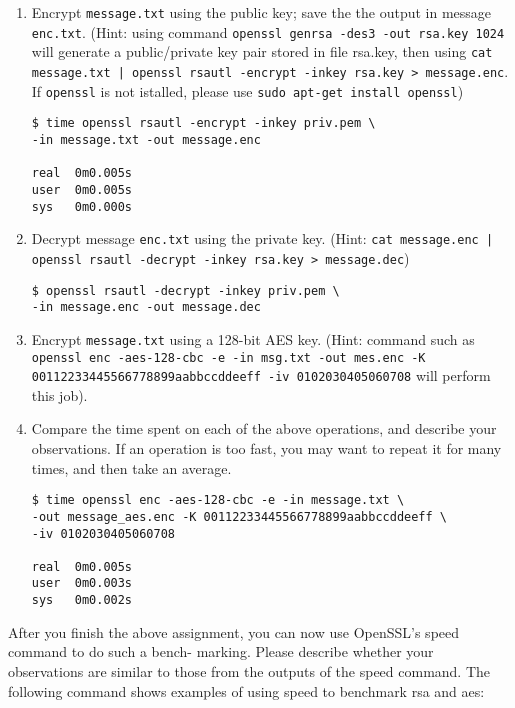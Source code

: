 \documentclass[11pt]{article}
\begin{document}
\begin{enumerate}
\item Encrypt \texttt{message.txt} using the public key; save the the output in message \texttt{enc.txt}.
(Hint: using command \texttt{openssl genrsa -des3 -out rsa.key 1024} will generate a public/private key pair stored in file rsa.key, then using \texttt{cat message.txt | openssl rsautl -encrypt -inkey rsa.key > message.enc}. If \texttt{openssl} is not istalled, please use \texttt{sudo apt-get install openssl})

\begin{verbatim}
$ time openssl rsautl -encrypt -inkey priv.pem \
-in message.txt -out message.enc

real  0m0.005s
user  0m0.005s
sys   0m0.000s
\end{verbatim}

\item Decrypt message \texttt{enc.txt} using the private key. (Hint: \texttt{cat message.enc | openssl rsautl -decrypt -inkey rsa.key > message.dec})

\begin{verbatim}
$ openssl rsautl -decrypt -inkey priv.pem \
-in message.enc -out message.dec
\end{verbatim}

\item Encrypt \texttt{message.txt} using a 128-bit AES key. (Hint: command such as \texttt{openssl enc -aes-128-cbc -e -in msg.txt -out mes.enc -K} \\ \texttt{00112233445566778899aabbccddeeff -iv 0102030405060708} will perform this job).
\item Compare the time spent on each of the above operations, and describe your observations. If an operation is too fast, you may want to repeat it for many times, and then take an average.

\begin{verbatim}
$ time openssl enc -aes-128-cbc -e -in message.txt \
-out message_aes.enc -K 00112233445566778899aabbccddeeff \
-iv 0102030405060708

real  0m0.005s
user  0m0.003s
sys   0m0.002s
\end{verbatim}

\end{enumerate}

After you finish the above assignment, you can now use OpenSSL's speed command to do such a bench-
marking. Please describe whether your observations are similar to those from the outputs of the speed
command. The following command shows examples of using speed to benchmark rsa and aes:
\end{document}
